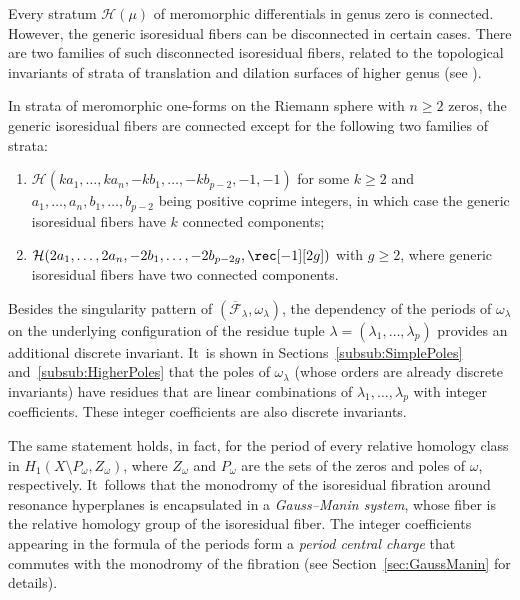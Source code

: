 Every stratum $\mathcal{H}(\mu)$ of meromorphic differentials in genus zero is connected. However, the generic isoresidual fibers can be disconnected in certain cases. There are two families of such disconnected isoresidual fibers, related to the topological invariants of strata of translation and dilation surfaces of higher genus (see \cite{Bo,ABW}).
\begin{thm}\label{thm:MAIN5}
In strata of meromorphic one-forms on the Riemann sphere with $n \geq 2$ zeros, the generic isoresidual fibers are connected except for the following two families of strata:
\begin{enumerate}
\item\label{thm:MAIN51}
$\mathcal{H}(ka_{1},\dots,ka_{n},-kb_{1},\dots,-kb_{p-2},-1,-1)$ for some $k \geq 2$ and $a_{1},\dots,a_{n},\allowbreak b_{1},\dots,b_{p-2}$ being positive coprime integers, in which case the generic isoresidual fibers have $k$ connected components;

\item\label{thm:MAIN52}
$\mathcal{H}(2a_{1},\dots,2a_{n},-2b_{1},\dots,-2b_{p-2g},\rec[-1][2g])$ with $g \geq 2$, where generic isoresidual fibers have two connected components.
\end{enumerate}
\end{thm}

Besides the singularity pattern of $(\overline{\mathcal{F}}_{\lambda},\omega_{\lambda})$, the dependency of the periods of $\omega_{\lambda}$ on the underlying configuration of the residue tuple $\lambda = (\lambda_{1},\ldots,\lambda_{p})$ provides an additional discrete invariant. It~is shown in Sections~\ref{subsub:SimplePoles} and~\ref{subsub:HigherPoles} that the poles of $\omega_{\lambda}$ (whose orders are already discrete invariants) have residues that are linear combinations of $\lambda_{1},\dots,\lambda_{p}$ with integer coefficients. These integer coefficients are also discrete invariants.

The same statement holds, in fact, for the period of every relative homology class in $H_{1}(X \setminus P_{\omega},Z_{\omega})$, where $Z_{\omega}$ and $P_{\omega}$ are the sets of the zeros and poles of $\omega$, respectively. It~follows that the monodromy of the isoresidual fibration around resonance hyperplanes is encapsulated in a \textit{Gauss--Manin system}, whose fiber is the relative homology group of the isoresidual fiber. The integer coefficients appearing in the \hbox{formula} of the periods form a \textit{period central charge} that commutes with the monodromy of the fibration (see Section~\ref{sec:GaussManin} for details).

